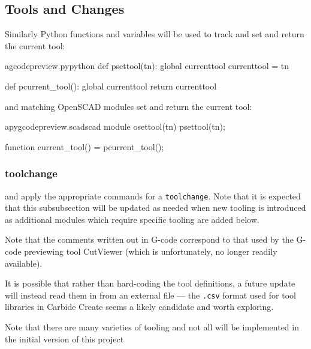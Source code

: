 \documentclass{ltxdoc}
\begin{document}
\subsection{Tools and Changes}
 
%
Similarly Python functions and variables will be used to track and
set and return the current tool: 
 
\lstset{firstnumber=\thegcpy}
\begin{writecode}{a}{gcodepreview.py}{python}
def psettool(tn):
    global currenttool
    currenttool = tn

def pcurrent_tool():
    global currenttool
    return currenttool

\end{writecode}
\addtocounter{gcpy}{8}
 
\noindent and matching OpenSCAD modules set and return the current tool: 
 
\lstset{firstnumber=\thepyscad}
\begin{writecode}{a}{pygcodepreview.scad}{scad}
module osettool(tn){
psettool(tn);}

function current_tool() = pcurrent_tool();

\end{writecode}
\addtocounter{pyscad}{5}
 
\subsubsection{toolchange}
\noindent and apply the appropriate commands for a \texttt{toolchange}.
\label{subsubsec:toolchange}%
Note that it is expected that this subsubsection will be updated as needed when new tooling
is introduced as additional modules which require specific tooling are added below.

Note that the comments written out in G-code correspond to that used by the G-code previewing tool 
CutViewer (which is unfortunately, no longer readily available).

It is possible that rather than hard-coding the tool definitions, a future update will instead
read them in from an external file --- the \texttt{.csv} format used for tool libraries in 
Carbide Create seems a likely candidate and worth exploring.

Note that there are many varieties of tooling and not all will be implemented in the initial 
version of this project
 
\end{document}
